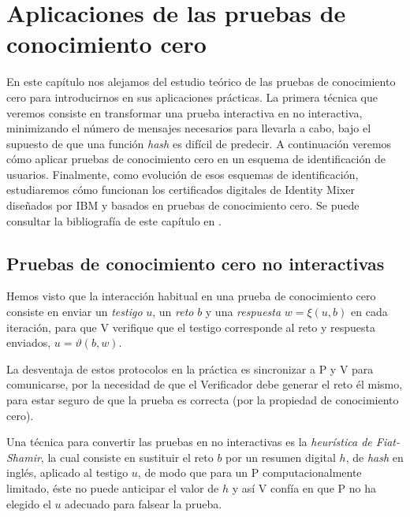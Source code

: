 

\chapter{Aplicaciones de las pruebas de conocimiento cero}\label{ch:aplicaciones} 


En este capítulo nos alejamos del estudio teórico de las pruebas de conocimiento cero para introducirnos en sus aplicaciones prácticas. La primera técnica que veremos consiste en transformar una prueba interactiva en no interactiva, minimizando el número de mensajes necesarios para llevarla a cabo, bajo el supuesto de que una función \textit{hash} es difícil de predecir. A continuación veremos cómo aplicar pruebas de conocimiento cero en un esquema de identificación de usuarios. Finalmente, como evolución de esos esquemas de identificación, estudiaremos cómo funcionan los certificados digitales de Identity Mixer diseñados por IBM y basados en pruebas de conocimiento cero. Se puede consultar la bibliografía de este capítulo en \citep{menezes1996handbook,stinson2005cryptography,idemixSpec}.



\section{Pruebas de conocimiento cero no interactivas}

Hemos visto que la interacción habitual en una prueba de conocimiento cero consiste en enviar un \textit{testigo} $u$, un \textit{reto} $b$ y una \textit{respuesta} $w=\xi(u,b)$ en cada iteración, para que V verifique que el testigo corresponde al reto y respuesta enviados, $u=\vartheta(b,w)$.

La desventaja de estos protocolos en la práctica es sincronizar a P y V para comunicarse, por la necesidad de que el Verificador debe generar el reto él mismo, para estar seguro de que la prueba es correcta (por la propiedad de conocimiento cero).

Una técnica para convertir las pruebas en no interactivas es la \textit{heurística de Fiat-Shamir}, la cual consiste en sustituir el reto $b$ por un resumen digital $h$, de \textit{hash} en inglés, aplicado al testigo $u$, de modo que para un P computacionalmente limitado, éste no puede anticipar el valor de $h$ y así V confía en que P no ha elegido el $u$ adecuado para falsear la prueba.

